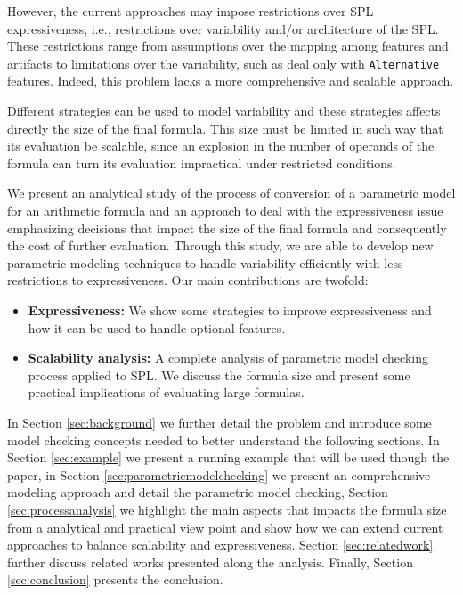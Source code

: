 \documentclass[conference]{IEEEtran}
\begin{document}
		However, the current approaches may impose restrictions over 
	SPL expressiveness, i.e., restrictions over variability and/or architecture of the SPL.
	These restrictions range from assumptions over the mapping among features and artifacts to
	limitations over the variability, such as deal only with \texttt{Alternative} features. Indeed,
	this problem lacks a more comprehensive and scalable approach. 
	
		Different strategies can be used to model variability and these strategies affects directly the
	size of the final formula. This size must be limited in such way that its evaluation be scalable, since
	an explosion in the number of operands of the formula can turn its evaluation impractical under restricted conditions.
	
		We present an analytical study of the process of
	 conversion of a parametric model for an arithmetic formula 
	 and an approach to deal with the expressiveness issue
	 emphasizing decisions that impact the size of the final formula  and consequently
	the cost of further evaluation.	Through this study, we are able to develop new parametric modeling techniques
	 to handle variability  efficiently with less restrictions to expressiveness. 
	 Our main contributions are twofold:
	 
	 \begin{itemize}
	  
	  \item \textbf{Expressiveness:} We show some strategies 
	  to improve expressiveness and how it can be used to
	  handle optional features.
	  
	  \item \textbf{Scalability analysis:} A complete analysis
	  of parametric model checking process applied to SPL. We discuss
	  the formula size and present some practical implications of 
	  evaluating large formulas.
	  	  
	 \end{itemize}
	 
	In Section \ref{sec:background} we further detail the problem and introduce some model checking concepts needed to better understand the 
	 following sections.
	 In Section \ref{sec:example} we present a running example that will be used though the paper, 
	 in Section \ref{sec:parametricmodelchecking} we present  an comprehensive modeling approach and detail the parametric model checking,
	 Section \ref{sec:processanalysis} we highlight the main aspects that impacts the formula size from a analytical and practical 
	 view point and show how we can extend current approaches to balance scalability and expressiveness.
	 Section \ref{sec:relatedwork} further discuss related works presented along the analysis.
	 Finally, Section \ref{sec:conclusion} presents the conclusion.
\end{document}
